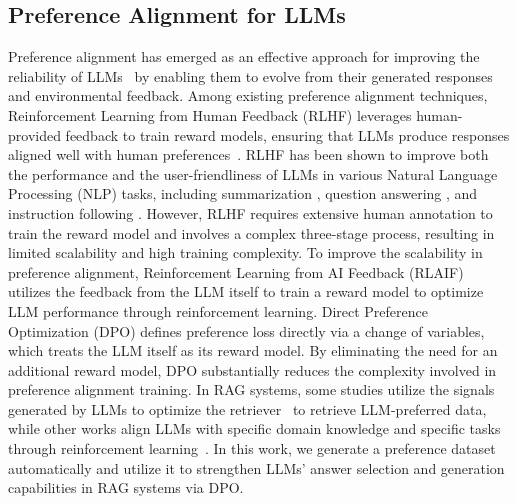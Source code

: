 \subsection{Preference Alignment for LLMs}
Preference alignment has emerged as an effective approach for improving the reliability of LLMs~\cite{Ouyang2022Training} by enabling them to evolve from their generated responses and environmental feedback.
Among existing preference alignment techniques, Reinforcement Learning from Human Feedback (RLHF) leverages human-provided feedback to train reward models, ensuring that LLMs produce responses aligned well with human preferences~\cite{Christiano2017RLHF,ziegler2019finetuning}.
RLHF has been shown to improve both the performance and the user-friendliness of LLMs in various Natural Language Processing (NLP) tasks, including summarization \cite{Stiennon2020summarize}, question answering \cite{Nakano2021WebGPT}, and instruction following \cite{Ouyang2022Training}.
However, RLHF requires extensive human annotation to train the reward model and involves a complex three-stage process, resulting in limited scalability and high training complexity.
To improve the scalability in preference alignment, Reinforcement Learning from AI Feedback (RLAIF)~\cite{Bai2022ConstitutionalAH,lee2024rlaif} utilizes the feedback from the LLM itself to train a reward model to optimize LLM performance through reinforcement learning. 
Direct Preference Optimization (DPO) \cite{Rafailov2023DPO} defines preference loss directly via a change of variables, which treats the LLM itself as its reward model.
By eliminating the need for an additional reward model, DPO substantially reduces the complexity involved in preference alignment training. 
In RAG systems, some studies utilize the signals generated by LLMs to optimize the retriever~\cite{Bonifacio2022InPars,shi2024replug} to retrieve LLM-preferred data, while other works align LLMs with specific domain knowledge and specific tasks through reinforcement learning~\cite{zhang2024knowledgeable,Yang2024IMRAG,Salemi2024Optimization,dong2024understandllmneedsdual,song2024measuring}.
In this work, we generate a preference dataset automatically and utilize it to strengthen LLMs' answer selection and generation capabilities in RAG systems via DPO.
